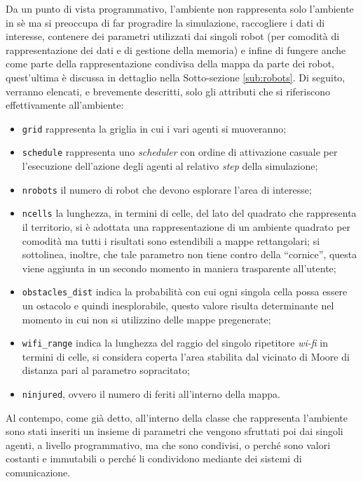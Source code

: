 Da un punto di vista programmativo, l'ambiente non rappresenta solo l'ambiente in sè ma si preoccupa di far progradire la simulazione, raccogliere i dati di interesse, contenere dei parametri utilizzati dai singoli robot (per comodità di rappresentazione dei dati e di gestione della memoria) e infine di fungere anche come parte della rappresentazione condivisa della mappa da parte dei robot, quest'ultima è discussa in dettaglio nella Sotto-sezione \ref{sub:robots}.
Di seguito, verranno elencati, e brevemente descritti, solo gli attributi che si riferiscono effettivamente all'ambiente:
\begin{itemize}
	\item \texttt{grid} rappresenta la griglia in cui i vari agenti si muoveranno;
	\item \texttt{schedule} rappresenta uno \textit{scheduler} con ordine di attivazione casuale per l'esecuzione dell'azione degli agenti al relativo \textit{step} della simulazione;
	\item \texttt{nrobots} il numero di robot che devono esplorare l'area di interesse;
	\item \texttt{ncells} la lunghezza, in termini di celle, del lato del quadrato che rappresenta il territorio, si è adottata una rappresentazione di un ambiente quadrato per comodità ma tutti i risultati sono estendibili a mappe rettangolari; si sottolinea, inoltre, che tale parametro non tiene contro della “cornice”, questa viene aggiunta in un secondo momento in maniera trasparente all'utente;
	\item \texttt{obstacles\_dist} indica la probabilità con cui ogni singola cella possa essere un ostacolo e quindi inesplorabile, questo valore risulta determinante nel momento in cui non si utilizzino delle mappe pregenerate;
	\item \texttt{wifi\_range} indica la lunghezza del raggio del singolo ripetitore \textit{wi-fi} in termini di celle, si considera coperta l'area stabilita dal vicinato di Moore di distanza pari al parametro sopracitato;
	\item \texttt{ninjured}, ovvero il numero di feriti all'interno della mappa.
\end{itemize}
Al contempo, come già detto, all'interno della classe che rappresenta l'ambiente sono stati inseriti un insieme di parametri che vengono sfruttati poi dai singoli agenti, a livello programmativo, ma che sono condivisi, o perché sono valori costanti e immutabili o perché li condividono mediante dei sistemi di comunicazione.

